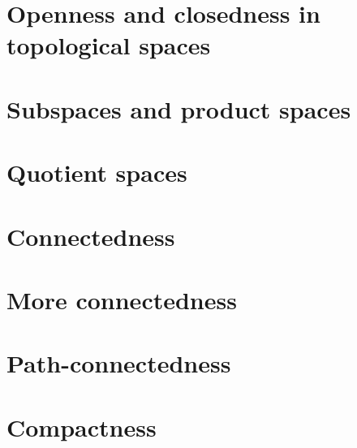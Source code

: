 \documentclass{article}
\begin{document}
\section{Openness and closedness in topological spaces}

\section{Subspaces and product spaces}

\section{Quotient spaces}

\section{Connectedness}

\section{More connectedness}

\section{Path-connectedness}

\section{Compactness}

\end{document}
